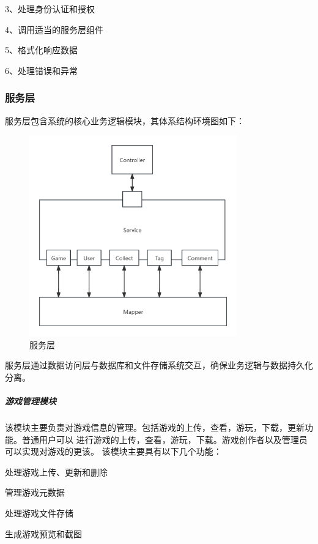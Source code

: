 \documentclass[12pt]{ctexart} %
\begin{document}
3、处理身份认证和授权

4、调用适当的服务层组件

5、格式化响应数据

6、处理错误和异常
\subsubsection{服务层}
服务层包含系统的核心业务逻辑模块，其体系结构环境图如下：

\begin{figure}[htbp]
  \centering 
  \includegraphics[width=0.8\textwidth]{service.png}
  \caption{服务层}
\end{figure}

服务层通过数据访问层与数据库和文件存储系统交互，确保业务逻辑与数据持久化分离。

\subparagraph{游戏管理模块}

该模块主要负责对游戏信息的管理。包括游戏的上传，查看，游玩，下载，更新功能。普通用户可以
进行游戏的上传，查看，游玩，下载。游戏创作者以及管理员可以实现对游戏的更该。
该模块主要具有以下几个功能：

处理游戏上传、更新和删除

管理游戏元数据

处理游戏文件存储

生成游戏预览和截图
\end{document}

